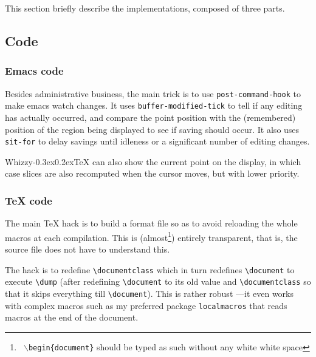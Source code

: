 \documentclass{article}
\let \lst \verb
\def \whizzy{{Whizzy\kern -0.3ex\raise 0.2ex\hbox{\TeX}}}
\begin{document}
This section briefly describe the implementations, composed of three parts.

\subsection {Code} 

\subsubsection* {Emacs code}

Besides administrative business, the main trick is to use 
\lst"post-command-hook" to make emacs watch changes. 
It uses \lst"buffer-modified-tick" to tell if any editing has actually
occurred, and compare the point position with the (remembered) position of
the region being displayed to see if saving should occur. It also uses
\lst"sit-for" to delay savings until idleness or a 
significant number of editing changes. 

{\whizzy} can also show the current point on the display, in which case
slices are also recomputed when the cursor moves, but with lower priority.

\subsubsection* {TeX code}

The main TeX hack is to build a format file so as to avoid reloading the
whole macros at each compilation. This is (almost\footnote{{\tt
$\backslash$begin\{document\}} should be typed as such without any white
white space}) entirely transparent, that is, the source file does not have
to understand this.

The hack is to redefine \lst"\documentclass" which in turn  redefines
\lst"\document" to execute \lst"\dump" (after redefining \lst"\document"
to its old value and \lst"\documentclass" so that it skips everything till
\lst"\document"). This is rather robust ---it even works with 
complex macros such as my preferred package \lst"localmacros" that reads
macros at the end of the document.
\end{document}
